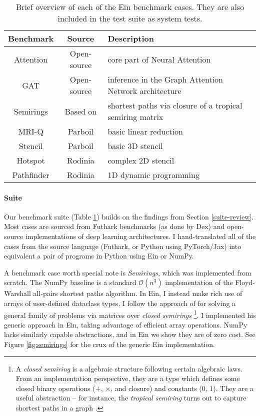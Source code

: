 \begin{table}[b]
    \centering
    \begin{tabular}{c|c|l}
       \textbf{Benchmark} & \textbf{Source} & \textbf{Description} \\ \hline
        Attention & Open-source & core part of Neural Attention \\
        GAT & Open-source & inference in the Graph Attention Network architecture \\
        Semirings & Based on \textcite{dolan2013fun} & shortest paths via closure of a tropical semiring matrix \\
        MRI-Q & Parboil & basic linear reduction \\
        Stencil & Parboil & basic 3D stencil \\
        Hotspot & Rodinia & complex 2D stencil \\
        Pathfinder & Rodinia & 1D dynamic programming 
    \end{tabular}
    \caption{Brief overview of each of the Ein benchmark cases. They are also included in the test suite as system tests.}
    \label{tab:benchmarks}
\end{table}


\paragraph{Suite} Our benchmark suite (Table \ref{tab:benchmarks}) builds on the findings from Section \ref{suite-review}. 
Most cases are sourced from Futhark benchmarks \cite{The_Futhark_Hackers_futhark-benchmarks} (as done by Dex) and open-source implementations of deep learning architectures.
I hand-translated all of the cases from the source language (Futhark, or Python using PyTorch/Jax) into equivalent a pair of programs in Python using Ein or NumPy.

A benchmark case worth special note is \textit{Semirings}, which was implemented from scratch. 
The NumPy baseline is a standard $\mathcal O(n^3)$ implementation of the Floyd-Warshall all-pairs shortest paths algorithm. 
In Ein, I instead make rich use of arrays of user-defined dataclass types. 
I follow the approach of \textcite{dolan2013fun} for solving a general family of problems via matrices over \textit{closed semirings}%
\footnote{A \textit{closed semiring} is a algebraic structure following certain algebraic laws.
From an implementation perspective, they are a type which defines some closed binary operations ($+$, $\times$, and closure) and constants ($0$, $1$).
They are a useful abstraction -- for instance, the \textit{tropical semiring} turns out to capture shortest paths in a graph \cite{lehmann1977algebraic}.}.
I implemented his generic approach in Ein, taking advantage of efficient array operations.
NumPy lacks similarly capable abstractions, and in Ein we show they are of zero cost.
See Figure \ref{fig:semirings} for the crux of the generic Ein implementation.

